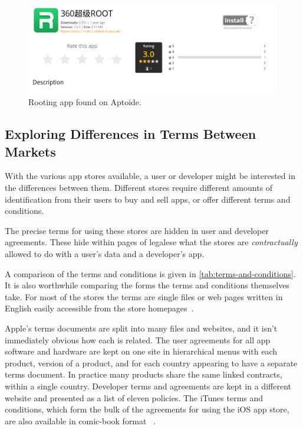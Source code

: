 \documentclass[thesis.tex]{subfiles}
\begin{document}
\begin{figure}
  \centering
  \includegraphics[width=0.8\linewidth]{figures/aptoide-root.png}
  \caption{Rooting app found on Aptoide.}
  \label{fig:aptoide-root}
\end{figure}


\subsection{Exploring Differences in Terms Between Markets}

With the various app stores available, a user or developer might be
interested in the differences between them.  Different stores require
different amounts of identification from their users to buy and sell
apps, or offer different terms and conditions.

The precise terms for using these stores are hidden in user and
developer agreements.  These hide within pages of legalese what the
stores are \emph{contractually} allowed to do with a user's data and a
developer's app.

A comparison of the terms and conditions is given in
\autoref{tab:terms-and-conditions}. It is also worthwhile comparing the forms
the terms and conditions themselves take. For most of the stores the terms are
single files or web pages written in English easily accessible from the store
homepages~\cite{yandex_yandex.store_nodate,aptoide_aptoide_nodate,google_google_nodate,amazon_amazon.co.uk_nodate}.

Apple's terms documents are split into many files and websites, and it isn't
immediately obvious how each is related. The user agreements for all app
software and hardware are kept on one site in hierarchical menus with each
product, version of a product, and for each country appearing to have a separate
terms document. In practice many products share the same linked contracts,
within a single country. Developer terms and agreements are kept in a different
website and presented as a list of eleven policies. The iTunes terms and
conditions, which form the bulk of the agreements for using the iOS app store,
are also available in comic-book format ~\cite{r._sikoryak_terms_2017}.
\end{document}
